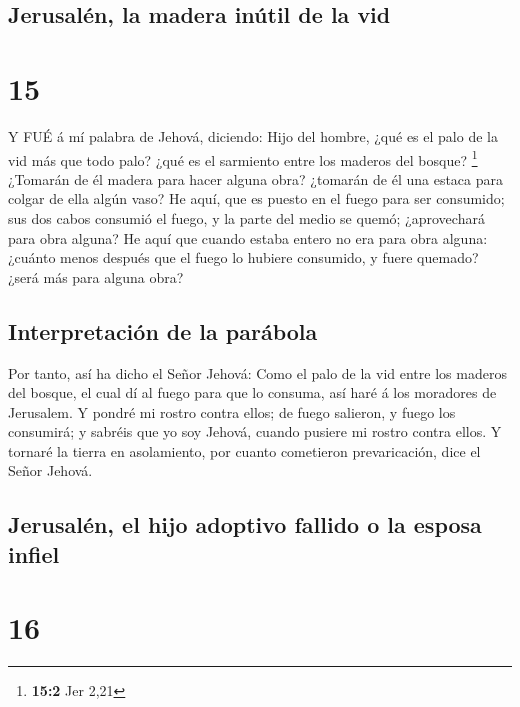 \hypertarget{jerusaluxe9n-la-madera-inuxfatil-de-la-vid}{%
\subsection{Jerusalén, la madera inútil de la
vid}\label{jerusaluxe9n-la-madera-inuxfatil-de-la-vid}}

\hypertarget{section-14}{%
\section{15}\label{section-14}}

 Y FUÉ á mí palabra de Jehová, diciendo:  Hijo
del hombre, ¿qué es el palo de la vid más que todo palo? ¿qué es el
sarmiento entre los maderos del bosque? \footnote{\textbf{15:2} Jer 2,21}
 ¿Tomarán de él madera para hacer alguna obra? ¿tomarán de
él una estaca para colgar de ella algún vaso?  He aquí, que
es puesto en el fuego para ser consumido; sus dos cabos consumió el
fuego, y la parte del medio se quemó; ¿aprovechará para obra alguna?
 He aquí que cuando estaba entero no era para obra alguna:
¿cuánto menos después que el fuego lo hubiere consumido, y fuere
quemado? ¿será más para alguna obra?

\hypertarget{interpretaciuxf3n-de-la-paruxe1bola}{%
\subsection{Interpretación de la
parábola}\label{interpretaciuxf3n-de-la-paruxe1bola}}

 Por tanto, así ha dicho el Señor Jehová: Como el palo de la
vid entre los maderos del bosque, el cual dí al fuego para que lo
consuma, así haré á los moradores de Jerusalem.  Y pondré mi
rostro contra ellos; de fuego salieron, y fuego los consumirá; y sabréis
que yo soy Jehová, cuando pusiere mi rostro contra ellos.  Y
tornaré la tierra en asolamiento, por cuanto cometieron prevaricación,
dice el Señor Jehová.

\hypertarget{jerusaluxe9n-el-hijo-adoptivo-fallido-o-la-esposa-infiel}{%
\subsection{Jerusalén, el hijo adoptivo fallido o la esposa
infiel}\label{jerusaluxe9n-el-hijo-adoptivo-fallido-o-la-esposa-infiel}}

\hypertarget{section-15}{%
\section{16}\label{section-15}}

